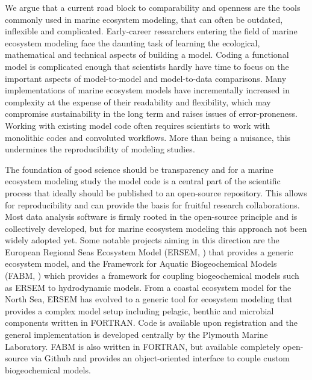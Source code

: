 \documentclass[journal abbreviation, manuscript]{copernicus}
\begin{document}
We argue that a current road block to comparability and openness are the tools commonly used in marine ecosystem modeling, that can often be outdated, inflexible and complicated.
Early-career researchers entering the field of marine ecosystem modeling face the daunting task of learning the ecological, mathematical and technical aspects of building a model. Coding a functional model is complicated enough that scientists hardly have time to focus on the important aspects of model-to-model and model-to-data comparisons. 
Many implementations of marine ecosystem models have incrementally increased in complexity at the expense of their readability and flexibility, which may compromise sustainability in the long term and raises issues of error-proneness. Working with existing model code often requires scientists to work with monolithic codes and convoluted workflows. More than being a nuisance, this undermines the reproducibility of modeling studies.

The foundation of good science should be transparency and for a marine ecosystem modeling study the model code is a central part of the scientific process that ideally should be published to an open-source repository. This allows for reproducibility and can provide the basis for fruitful research collaborations. Most data analysis software is firmly rooted in the open-source principle and is collectively developed, but for marine ecosystem modeling this approach not been widely adopted yet.
Some notable projects aiming in this direction are the European Regional Seas Ecosystem Model (ERSEM, \citet{Butenschon2016}) that provides a generic ecosystem model, and the Framework for Aquatic Biogeochemical Models (FABM, \citet{Bruggeman2014a}) which provides a framework for coupling biogeochemical models such as ERSEM to hydrodynamic models. 
From a coastal ecosystem model for the North Sea, ERSEM has evolved to a generic tool for ecosystem modeling that provides a complex model setup including pelagic, benthic and microbial components written in FORTRAN. Code is available upon registration and the general implementation is developed centrally by the Plymouth Marine Laboratory. FABM is also written in FORTRAN, but available completely open-source via Github and provides an object-oriented interface to couple custom biogeochemical models. 
\end{document}
